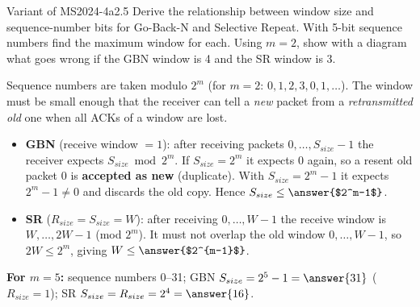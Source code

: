 \begin{question}{Variant of MS2024-4a}{2.5}
Derive the relationship between window size and sequence-number bits for Go-Back-N and Selective Repeat. With 5-bit sequence numbers find the maximum window for each. Using $m=2$, show with a diagram what goes wrong if the GBN window is 4 and the SR window is 3.
\end{question}
\begin{solution}
Sequence numbers are taken modulo $2^m$ (for $m=2$: $0,1,2,3,0,1,\dots$). The window must be small enough that the receiver can tell a \emph{new} packet from a \emph{retransmitted old} one when all ACKs of a window are lost.
\begin{itemize}
\item \textbf{GBN} (receive window $=1$): after receiving packets $0,\dots,S_{size}-1$ the receiver expects $S_{size} \bmod 2^m$. If $S_{size}=2^m$ it expects $0$ again, so a resent old packet 0 is \textbf{accepted as new} (duplicate). With $S_{size}=2^m-1$ it expects $2^m-1\neq0$ and discards the old copy. Hence $S_{size}\le \answer{$2^m-1$}$.
\item \textbf{SR} ($R_{size}=S_{size}=W$): after receiving $0,\dots,W-1$ the receive window is $W,\dots,2W-1$ (mod $2^m$). It must not overlap the old window $0,\dots,W-1$, so $2W\le2^m$, giving $W\le\answer{$2^{m-1}$}$.
\end{itemize}
\textbf{For $m=5$:} sequence numbers 0--31; GBN $S_{size}=2^5-1=\answer{31}$ ($R_{size}=1$); SR $S_{size}=R_{size}=2^4=\answer{16}$.
\end{solution}

